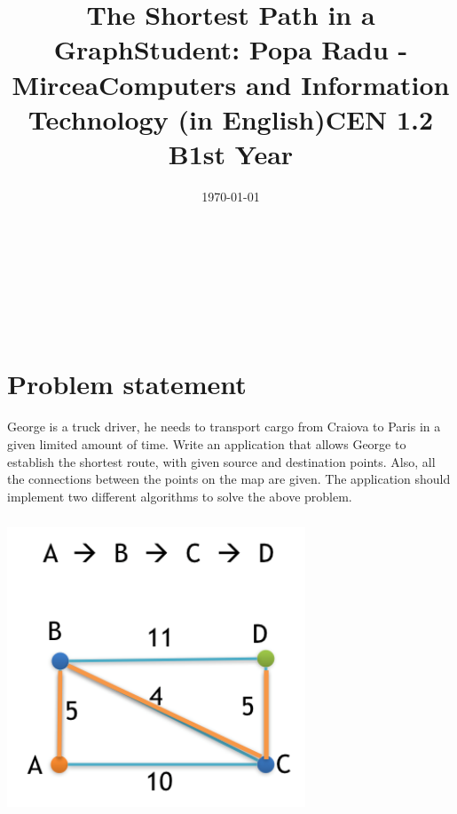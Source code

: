 \documentclass[14pt]{article}
\begin{document}
\title{\huge The Shortest Path in a Graph}
\date{\today}
\maketitle
\begin{center}
\vspace{30 mm}

\title{\huge Student: Popa Radu - Mircea}
\\\vspace{10 mm}
\title{\huge Computers and Information Technology (in English)}
\\\vspace{10 mm}
\title{\huge CEN 1.2 B}
\\\vspace{10 mm}
\title{\huge 1st Year}
\date{}
\maketitle

\newpage
\end{center}
\section*{Problem statement}
George is a truck driver, he needs to transport cargo from Craiova to Paris in a given limited amount of time. Write an application that allows George to establish the shortest route, with given source and destination points. Also, all the connections between the points on the map are given. The
application should implement two different algorithms to solve the above problem.
\begin{center}\includegraphics[height=3.5in, width = 3.5in]{graf.jpg}
\end{center}
\end{document}
